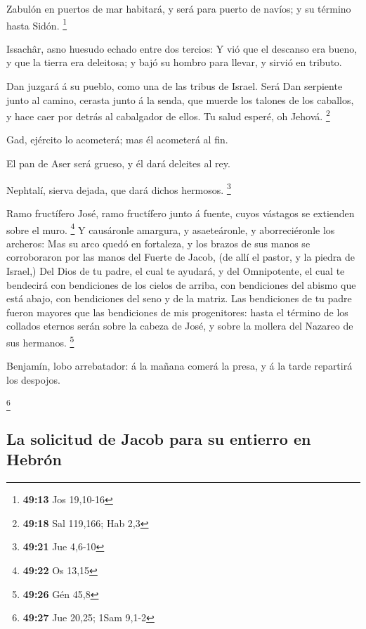  Zabulón en puertos de mar habitará, y será para puerto
de navíos; y su término hasta Sidón. \footnote{\textbf{49:13} Jos
  19,10-16}

 Issachâr, asno huesudo echado entre dos tercios:
 Y vió que el descanso era bueno, y que la tierra era
deleitosa; y bajó su hombro para llevar, y sirvió en tributo.

 Dan juzgará á su pueblo, como una de las tribus de
Israel.  Será Dan serpiente junto al camino, cerasta
junto á la senda, que muerde los talones de los caballos, y hace caer
por detrás al cabalgador de ellos.  Tu salud esperé, oh
Jehová. \footnote{\textbf{49:18} Sal 119,166; Hab 2,3}

 Gad, ejército lo acometerá; mas él acometerá al fin.

 El pan de Aser será grueso, y él dará deleites al rey.

 Nephtalí, sierva dejada, que dará dichos hermosos.
\footnote{\textbf{49:21} Jue 4,6-10}

 Ramo fructífero José, ramo fructífero junto á fuente,
cuyos vástagos se extienden sobre el muro. \footnote{\textbf{49:22} Os
  13,15}  Y causáronle amargura, y asaeteáronle, y
aborreciéronle los archeros:  Mas su arco quedó en
fortaleza, y los brazos de sus manos se corroboraron por las manos del
Fuerte de Jacob, (de allí el pastor, y la piedra de Israel,)
 Del Dios de tu padre, el cual te ayudará, y del
Omnipotente, el cual te bendecirá con bendiciones de los cielos de
arriba, con bendiciones del abismo que está abajo, con bendiciones del
seno y de la matriz.  Las bendiciones de tu padre fueron
mayores que las bendiciones de mis progenitores: hasta el término de los
collados eternos serán sobre la cabeza de José, y sobre la mollera del
Nazareo de sus hermanos. \footnote{\textbf{49:26} Gén 45,8}

 Benjamín, lobo arrebatador: á la mañana comerá la presa,
y á la tarde repartirá los despojos.

\footnote{\textbf{49:27} Jue 20,25; 1Sam 9,1-2}

\hypertarget{la-solicitud-de-jacob-para-su-entierro-en-hebruxf3n}{%
\subsection{La solicitud de Jacob para su entierro en
Hebrón}\label{la-solicitud-de-jacob-para-su-entierro-en-hebruxf3n}}

